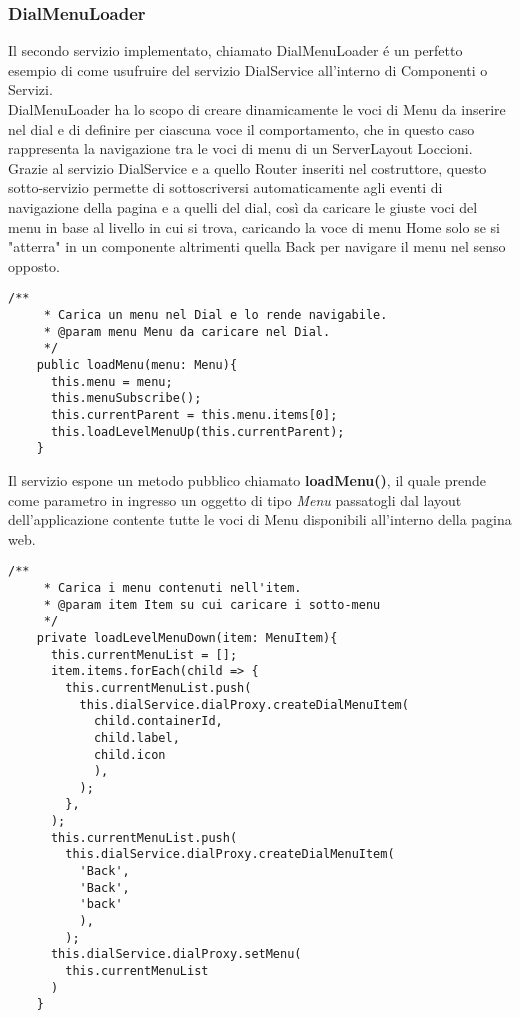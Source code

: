 \subsubsection{DialMenuLoader}

Il secondo servizio implementato, chiamato DialMenuLoader é un perfetto esempio di come usufruire del servizio DialService all'interno di Componenti o Servizi.\\

DialMenuLoader ha lo scopo di creare dinamicamente le voci di Menu da inserire nel dial e di definire per ciascuna voce il comportamento, che in questo caso rappresenta la navigazione tra le voci di menu di un ServerLayout Loccioni.\\

Grazie al servizio DialService e a quello Router inseriti nel costruttore, questo sotto-servizio permette di sottoscriversi automaticamente agli eventi di navigazione della pagina e a quelli del dial, così da caricare le giuste voci del menu in base al livello in cui si trova, caricando la voce di menu Home solo se si "atterra" in un componente altrimenti quella Back per navigare il menu nel senso opposto.\\

\begin{lstlisting}[caption={Metodo loadLevelMenuUp},style=javaScriptCode]
    /**
     * Carica un menu nel Dial e lo rende navigabile.
     * @param menu Menu da caricare nel Dial.
     */
    public loadMenu(menu: Menu){
      this.menu = menu;
      this.menuSubscribe();
      this.currentParent = this.menu.items[0];
      this.loadLevelMenuUp(this.currentParent);
    }
\end{lstlisting} 
\vspace{1.0cm}

Il servizio espone un metodo pubblico chiamato \textbf{loadMenu()}, il quale prende come parametro in ingresso un oggetto di tipo \emph{Menu} passatogli dal layout dell'applicazione contente tutte le voci di Menu disponibili all'interno della pagina web.\\

\begin{lstlisting}[caption={Metodo loadLevelMenuDown},style=javaScriptCode]
     /**
     * Carica i menu contenuti nell'item.
     * @param item Item su cui caricare i sotto-menu
     */
    private loadLevelMenuDown(item: MenuItem){
      this.currentMenuList = [];
      item.items.forEach(child => {
        this.currentMenuList.push(
          this.dialService.dialProxy.createDialMenuItem(
            child.containerId,
            child.label, 
            child.icon
            ),
          );
        },
      );
      this.currentMenuList.push(
        this.dialService.dialProxy.createDialMenuItem(
          'Back',
          'Back', 
          'back'
          ),
        );
      this.dialService.dialProxy.setMenu(
        this.currentMenuList
      )
    }
\end{lstlisting} 
\vspace{1.0cm}

